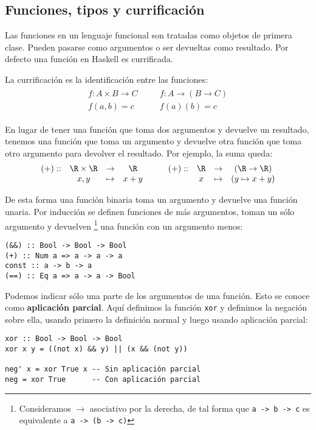 \subsection {Funciones, tipos y currificación}
Las funciones en un lenguaje funcional son tratadas como objetos
de primera clase. Pueden pasarse como argumentos o ser devueltas como resultado.
Por defecto una función en Haskell es currificada.

La currificación es la identificación entre las funciones:
\begin{align*}
\begin{matrix}
f: A \times B \to C    & \quad &   f: A \to (B \to C) \\
f(a,b) = c       & \quad &     f(a)(b) =  c
\end{matrix}
\end{align*}

En lugar de tener una función que toma dos argumentos y devuelve
un resultado, tenemos una función que toma un argumento y devuelve otra
función que toma otro argumento para devolver el resultado.
Por ejemplo, la suma queda:
\begin{align*}
\begin{matrix}
(+) :: & \R \times \R & \rightarrow & \R    & \quad & (+) :: & \R & \rightarrow & (\R \rightarrow  \R) \\
       & x , y      & \mapsto     & x+y  & \quad &        & x & \mapsto     & (y  \mapsto x+y)
\end{matrix}
\end{align*}

De esta forma una función binaria toma un argumento y devuelve una función
unaria. Por inducción se definen funciones de más argumentos, toman un sólo argumento
y devuelven
\footnote{Consideramos $\rightarrow$ asociativo por la derecha, de tal forma que
\texttt{a -> b -> c} es equivalente a \texttt{a -> (b -> c)}}
una función con un argumento menos:

\begin{lstlisting}
(&&) :: Bool -> Bool -> Bool
(+) :: Num a => a -> a -> a
const :: a -> b -> a
(==) :: Eq a => a -> a -> Bool
\end{lstlisting}

Podemos indicar sólo una parte de los argumentos de una función. Esto se conoce
como \textbf{aplicación parcial}. Aquí definimos la función
\texttt{xor} y definimos la negación sobre ella, usando primero la definición
normal y luego usando aplicación parcial:

\begin{lstlisting}
xor :: Bool -> Bool -> Bool
xor x y = ((not x) && y) || (x && (not y))

neg' x = xor True x -- Sin aplicación parcial
neg = xor True      -- Con aplicación parcial
\end{lstlisting}


